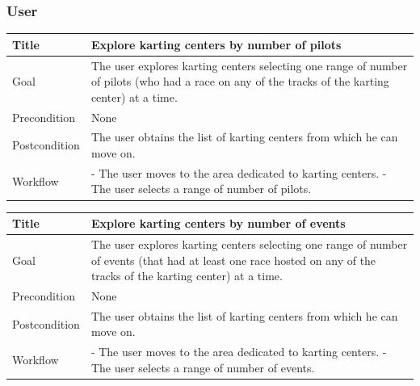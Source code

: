 \documentclass{beamer}
\begin{document}
\begin{frame}
    \frametitle{User}
    \begin{table}
        \tiny
        \begin{tabular}{|p{2cm}|p{6cm}|}
        \hline
        Title & \textbf{Explore karting centers by number of pilots} \\
        \hline
        Goal & The user explores karting centers selecting one range of number of pilots (who had a race on 
        any of the tracks of the karting center) at a time. \\
        \hline
        Precondition & None \\
        \hline
        Postcondition & The user obtains the list of karting centers from which he can move on.\\
        \hline
        Workflow &
        - The user moves to the area dedicated to karting centers. \newline
        - The user selects a range of number of pilots. \\
        \hline
        \end{tabular}
\end{table}

\begin{table}
    \tiny
    \begin{tabular}{|p{2cm}|p{6cm}|}
    \hline
    Title & \textbf{Explore karting centers by number of events} \\
    \hline
    Goal & The user explores karting centers selecting one range of number of events (that had
    at least one race hosted on 
    any of the tracks of the karting center) at a time. \\
    \hline
    Precondition & None \\
    \hline
    Postcondition & The user obtains the list of karting centers from which he can move on.\\
    \hline
    Workflow &
    - The user moves to the area dedicated to karting centers. \newline
    - The user selects a range of number of events. \\
    \hline
    \end{tabular}
\end{table}
\end{frame}


\end{document}
